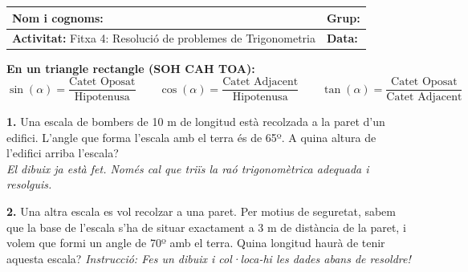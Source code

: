 \documentclass[12pt,a4paper]{article}
\begin{document}
\begingroup
\renewcommand{\arraystretch}{2.2}
\begin{tabularx}{\textwidth}{|X|p{4cm}|}
    \hline
    \textbf{Nom i cognoms:} & \textbf{Grup:} \\ \hline
    \textbf{Activitat:} Fitxa 4: Resolució de problemes de Trigonometria & \textbf{Data:} \\ \hline
\end{tabularx}
\endgroup

\vspace{0.4cm}

\begin{tcolorbox}[colback=blue!5,colframe=blue!70!black,title=Recordatori ràpid: Fórmules Trigonomètriques]
\small
\textbf{En un triangle rectangle (SOH CAH TOA):} \\
$\sin(\alpha) = \dfrac{\text{Catet Oposat}}{\text{Hipotenusa}} \quad \quad \cos(\alpha) = \dfrac{\text{Catet Adjacent}}{\text{Hipotenusa}} \quad \quad \tan(\alpha) = \dfrac{\text{Catet Oposat}}{\text{Catet Adjacent}}$ \\[0.3cm]
\end{tcolorbox}


\textbf{1.} Una escala de bombers de 10 m de longitud està recolzada a la paret d'un edifici. L'angle que forma l'escala amb el terra és de 65º. A quina altura de l'edifici arriba l'escala? \\
\textit{El dibuix ja està fet. Només cal que triïs la raó trigonomètrica adequada i resolguis.}

\begin{minipage}{0.3\textwidth}
\end{minipage}
\begin{minipage}{0.65\textwidth}
\end{minipage}

\vspace{0.5cm}

\textbf{2.} Una altra escala es vol recolzar a una paret. Per motius de seguretat, sabem que la base de l'escala s'ha de situar exactament a 3 m de distància de la paret, i volem que formi un angle de 70º amb el terra. Quina longitud haurà de tenir aquesta escala?  \textit{Instrucció: Fes un dibuix i col·loca-hi les dades abans de resoldre!}
\end{document}

